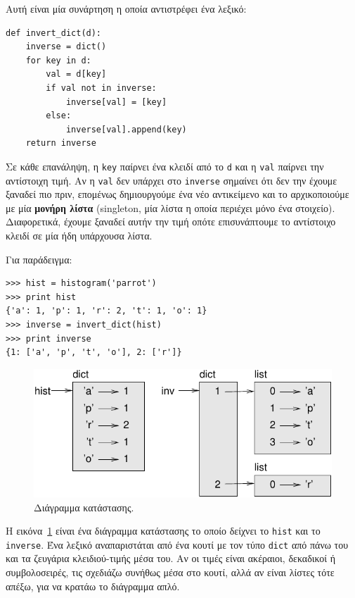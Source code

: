 \documentclass[10pt]{book}
\begin{document}
Αυτή είναι μία συνάρτηση η οποία αντιστρέφει ένα λεξικό:

\begin{verbatim}
def invert_dict(d):
    inverse = dict()
    for key in d:
        val = d[key]
        if val not in inverse:
            inverse[val] = [key]
        else:
            inverse[val].append(key)
    return inverse
\end{verbatim}
%
Σε κάθε επανάληψη, η {\tt key} παίρνει ένα κλειδί από το {\tt d} και η {\tt val} παίρνει την αντίστοιχη τιμή. Αν η {\tt val} δεν υπάρχει στο {\tt inverse}  σημαίνει ότι δεν την έχουμε ξαναδεί πιο πριν, επομένως δημιουργούμε ένα νέο αντικείμενο και το αρχικοποιούμε με μία {\bf μονήρη λίστα} (singleton, μία λίστα η οποία περιέχει μόνο ένα στοιχείο). Διαφορετικά, έχουμε ξαναδεί αυτήν την τιμή οπότε επισυνάπτουμε το αντίστοιχο κλειδί σε μία ήδη υπάρχουσα λίστα.

Για παράδειγμα:

\begin{verbatim}
>>> hist = histogram('parrot')
>>> print hist
{'a': 1, 'p': 1, 'r': 2, 't': 1, 'o': 1}
>>> inverse = invert_dict(hist)
>>> print inverse
{1: ['a', 'p', 't', 'o'], 2: ['r']}
\end{verbatim}

\begin{figure}
\centerline
{\includegraphics[scale=0.8]{figs/dict1.pdf}}
 \caption{Διάγραμμα κατάστασης.} 
\label{fig.dict1}
\end{figure}

Η εικόνα~\ref{fig.dict1} είναι ένα διάγραμμα κατάστασης το οποίο δείχνει το  {\tt hist} και το {\tt inverse}. Ένα λεξικό αναπαριστάται από ένα κουτί με τον τύπο {\tt dict} από πάνω του και τα ζευγάρια κλειδιού-τιμής μέσα του. Αν οι τιμές είναι ακέραιοι, δεκαδικοί ή συμβολοσειρές, τις σχεδιάζω συνήθως μέσα στο κουτί, αλλά αν είναι λίστες τότε απέξω, για να κρατάω το διάγραμμα απλό.
\end{document}
